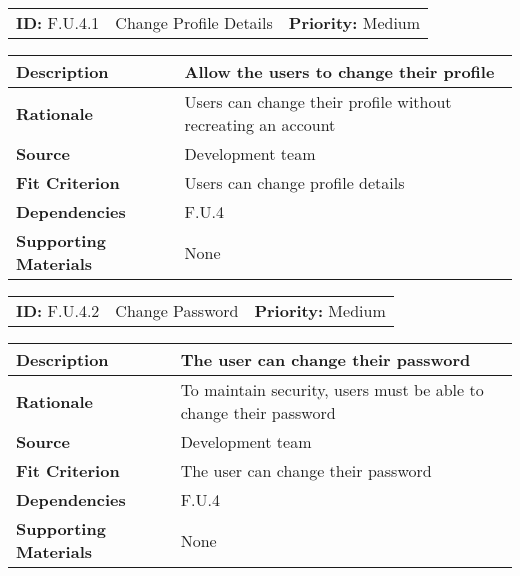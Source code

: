 \begin{table}[H]
    \begin{tabularx}{\textwidth}{| l | X | l |}
        \hline
        \textbf{ID:} F.U.4.1 & Change Profile Details & \textbf{Priority:} Medium \\
    \end{tabularx}
    \begin{tabularx}{\textwidth}{| l | X |}
        \hline
        \textbf{Description} & Allow the users to change their profile\\ \hline
        \textbf{Rationale} & Users can change their profile without recreating an account \\ \hline
        \textbf{Source} & Development team\\ \hline
        \textbf{Fit Criterion} & Users can change profile details \\ \hline
        \textbf{Dependencies} & F.U.4 \\ \hline
        \textbf{Supporting Materials} & None \\ \hline
    \end{tabularx}
\end{table}

\begin{table}[H]
    \begin{tabularx}{\textwidth}{| l | X | l |}
        \hline
        \textbf{ID:} F.U.4.2 & Change Password & \textbf{Priority:} Medium \\
    \end{tabularx}
    \begin{tabularx}{\textwidth}{| l | X |}
        \hline
        \textbf{Description} & The user can change their password \\ \hline
        \textbf{Rationale} & To maintain security, users must be able to change their password \\ \hline
        \textbf{Source} & Development team\\ \hline
        \textbf{Fit Criterion} & The user can change their password \\ \hline
        \textbf{Dependencies} & F.U.4 \\ \hline
        \textbf{Supporting Materials} & None \\ \hline
    \end{tabularx}
\end{table}

